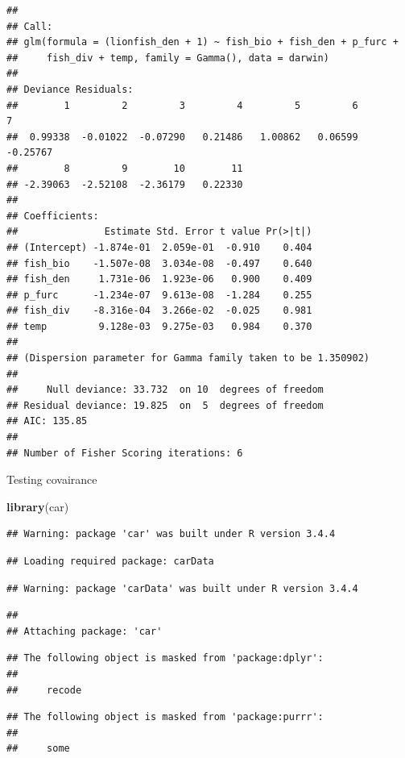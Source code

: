 \documentclass[]{article}
\newenvironment{Shaded}{\begin{snugshade}}{\end{snugshade}}
\newcommand{\KeywordTok}[1]{\textcolor[rgb]{0.13,0.29,0.53}{\textbf{#1}}}
\newcommand{\NormalTok}[1]{#1}
\begin{document}
\begin{verbatim}
## 
## Call:
## glm(formula = (lionfish_den + 1) ~ fish_bio + fish_den + p_furc + 
##     fish_div + temp, family = Gamma(), data = darwin)
## 
## Deviance Residuals: 
##        1         2         3         4         5         6         7  
##  0.99338  -0.01022  -0.07290   0.21486   1.00862   0.06599  -0.25767  
##        8         9        10        11  
## -2.39063  -2.52108  -2.36179   0.22330  
## 
## Coefficients:
##               Estimate Std. Error t value Pr(>|t|)
## (Intercept) -1.874e-01  2.059e-01  -0.910    0.404
## fish_bio    -1.507e-08  3.034e-08  -0.497    0.640
## fish_den     1.731e-06  1.923e-06   0.900    0.409
## p_furc      -1.234e-07  9.613e-08  -1.284    0.255
## fish_div    -8.316e-04  3.266e-02  -0.025    0.981
## temp         9.128e-03  9.275e-03   0.984    0.370
## 
## (Dispersion parameter for Gamma family taken to be 1.350902)
## 
##     Null deviance: 33.732  on 10  degrees of freedom
## Residual deviance: 19.825  on  5  degrees of freedom
## AIC: 135.85
## 
## Number of Fisher Scoring iterations: 6
\end{verbatim}

Testing covairance

\begin{Shaded}
\begin{Highlighting}[]
\KeywordTok{library}\NormalTok{(car)}
\end{Highlighting}
\end{Shaded}

\begin{verbatim}
## Warning: package 'car' was built under R version 3.4.4
\end{verbatim}

\begin{verbatim}
## Loading required package: carData
\end{verbatim}

\begin{verbatim}
## Warning: package 'carData' was built under R version 3.4.4
\end{verbatim}

\begin{verbatim}
## 
## Attaching package: 'car'
\end{verbatim}

\begin{verbatim}
## The following object is masked from 'package:dplyr':
## 
##     recode
\end{verbatim}

\begin{verbatim}
## The following object is masked from 'package:purrr':
## 
##     some
\end{verbatim}
\end{document}
